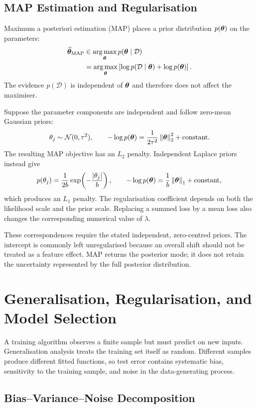 \subsection{MAP Estimation and Regularisation}

Maximum a posteriori estimation (MAP) places a prior distribution $p(\bm{\theta})$ on the parameters:
\begin{align*}
  \widehat{\bm{\theta}}_{\mathrm{MAP}}
  &\in\operatorname*{arg\,max}_{\bm{\theta}}p(\bm{\theta}\mid\mathcal D)\\
  &=\operatorname*{arg\,max}_{\bm{\theta}}
    \left[\log p(\mathcal D\mid\bm{\theta})+\log p(\bm{\theta})\right].
\end{align*}
The evidence $p(\mathcal D)$ is independent of $\bm{\theta}$ and therefore does not affect the maximiser.

Suppose the parameter components are independent and follow zero-mean Gaussian priors:
\[
  \theta_j\sim\mathcal N(0,\tau^2),
  \qquad
  -\log p(\bm{\theta})
  =\frac{1}{2\tau^2}\left\lVert \bm{\theta}\right\rVert_2^2+\text{constant}.
\]
The resulting MAP objective has an $L_2$ penalty. Independent Laplace priors instead give
\[
  p(\theta_j)=\frac{1}{2b}
    \exp\!\left(-\frac{\left\lvert \theta_j\right\rvert}{b}\right),
  \qquad
  -\log p(\bm{\theta})
  =\frac1b\left\lVert \bm{\theta}\right\rVert_1+\text{constant},
\]
which produces an $L_1$ penalty. The regularisation coefficient depends on both the likelihood scale and the prior scale. Replacing a summed loss by a mean loss also changes the corresponding numerical value of $\lambda$.

These correspondences require the stated independent, zero-centred priors. The intercept is commonly left unregularised because an overall shift should not be treated as a feature effect. MAP returns the posterior mode; it does not retain the uncertainty represented by the full posterior distribution.


\section{Generalisation, Regularisation, and Model Selection}

A training algorithm observes a finite sample but must predict on new inputs. Generalisation analysis treats the training set itself as random. Different samples produce different fitted functions, so test error contains systematic bias, sensitivity to the training sample, and noise in the data-generating process.

\subsection{Bias--Variance--Noise Decomposition}

